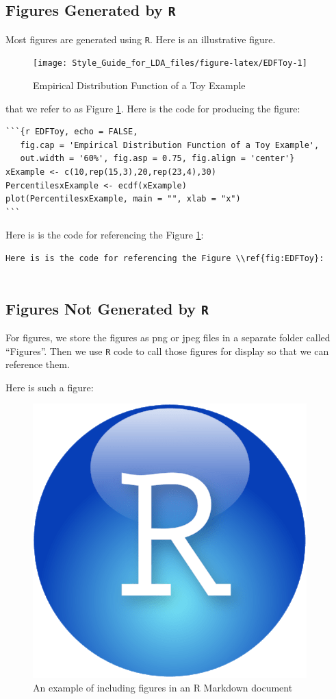 \documentclass[]{book}
\theoremstyle{definition}
\theoremstyle{definition}
\theoremstyle{definition}
\theoremstyle{remark}
\begin{document}
\subsection{\texorpdfstring{Figures Generated by
\texttt{R}}{Figures Generated by R}}\label{figures-generated-by-r}

Most figures are generated using \texttt{R}. Here is an illustrative
figure.

\begin{figure}

{\centering \texttt{[image: Style\_Guide\_for\_LDA\_files/figure-latex/EDFToy-1]} 

}

\caption{Empirical Distribution Function of a Toy Example}\label{fig:EDFToy}
\end{figure}

that we refer to as Figure \ref{fig:EDFToy}. Here is the code for
producing the figure:

\begin{verbatim}
```{r EDFToy, echo = FALSE, 
   fig.cap = 'Empirical Distribution Function of a Toy Example',
   out.width = '60%', fig.asp = 0.75, fig.align = 'center'}
xExample <- c(10,rep(15,3),20,rep(23,4),30)
PercentilesxExample <- ecdf(xExample)
plot(PercentilesxExample, main = "", xlab = "x")
```
\end{verbatim}

Here is is the code for referencing the Figure \ref{fig:EDFToy}:

\begin{verbatim}
Here is is the code for referencing the Figure \\ref{fig:EDFToy}:
    
\end{verbatim}

\subsection{\texorpdfstring{Figures Not Generated by
\texttt{R}}{Figures Not Generated by R}}\label{figures-not-generated-by-r}

For figures, we store the figures as png or jpeg files in a separate
folder called ``Figures''. Then we use \texttt{R} code to call those
figures for display so that we can reference them.

Here is such a figure:

\begin{figure}

{\centering \includegraphics[width=0.05\linewidth]{Figures/RStudio-Ball} 

}

\caption{An example of including figures in an R Markdown document}\label{fig:ExampleFigure}
\end{figure}
\end{document}
